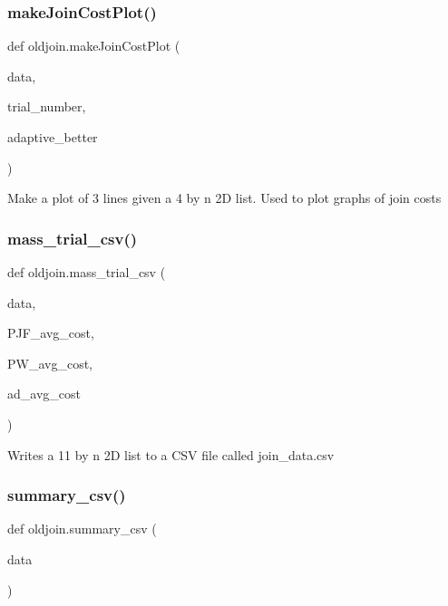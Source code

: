 \subsubsection{\texorpdfstring{makeJoinCostPlot()}{makeJoinCostPlot()}}
{\footnotesize\ttfamily def oldjoin.\+make\+Join\+Cost\+Plot (\begin{DoxyParamCaption}\item[{}]{data,  }\item[{}]{trial\+\_\+number,  }\item[{}]{adaptive\+\_\+better }\end{DoxyParamCaption})}

\begin{DoxyVerb}Make a plot of 3 lines given a 4 by n 2D list. Used to plot graphs of join costs \end{DoxyVerb}
 \mbox{\label{namespaceoldjoin_a3c1f060ef4b4343cdc4231fbccfeadb9}} 
\subsubsection{\texorpdfstring{mass\_trial\_csv()}{mass\_trial\_csv()}}
{\footnotesize\ttfamily def oldjoin.\+mass\+\_\+trial\+\_\+csv (\begin{DoxyParamCaption}\item[{}]{data,  }\item[{}]{P\+J\+F\+\_\+avg\+\_\+cost,  }\item[{}]{P\+W\+\_\+avg\+\_\+cost,  }\item[{}]{ad\+\_\+avg\+\_\+cost }\end{DoxyParamCaption})}

\begin{DoxyVerb}Writes a 11 by n 2D list to a CSV file called join_data.csv \end{DoxyVerb}
 \mbox{\label{namespaceoldjoin_a7df1afa3b1e7e79e86d2db42e625ec70}} 
\subsubsection{\texorpdfstring{summary\_csv()}{summary\_csv()}}
{\footnotesize\ttfamily def oldjoin.\+summary\+\_\+csv (\begin{DoxyParamCaption}\item[{}]{data }\end{DoxyParamCaption})}

